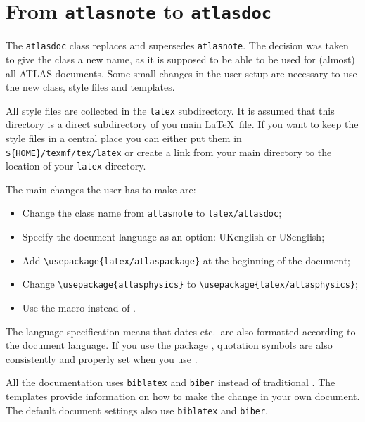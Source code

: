 \section{From \texttt{atlasnote} to \texttt{atlasdoc}}
\label{sec:oldnote}

The \texttt{atlasdoc} class replaces and supersedes \texttt{atlasnote}.
The decision was taken to give the class a new name, as it is supposed to be
able to be used for (almost) all ATLAS documents.
Some small changes in the user setup are necessary to use the new
class, style files and templates.

All style files are collected in the \texttt{latex} subdirectory.
It is assumed that this directory is a direct subdirectory of you main \LaTeX\ file.
If you want to keep the style files in a central place you can either put them in
\verb|${HOME}/texmf/tex/latex| or create a link from your main directory to the location of
your \texttt{latex} directory.

The main changes the user has to make are:
\begin{itemize}
\item Change the class name from \texttt{atlasnote} to \texttt{latex/atlasdoc};
\item Specify the document language as an option: UKenglish or USenglish;
\item Add \verb|\usepackage{latex/atlaspackage}| at the beginning of the document;
\item Change \verb|\usepackage{atlasphysics}| to \verb|\usepackage{latex/atlasphysics}|; 
\item Use the macro  instead of .
\end{itemize}

The language specification means that dates etc.\ are also formatted according to 
the document language. 
If you use the package , quotation symbols are also consistently and properly set
when you use .

All the documentation uses \texttt{biblatex} and \texttt{biber} instead of traditional \BibTeX.
The templates provide information on how to make the change in your own document.
The default document settings also use \texttt{biblatex} and \texttt{biber}.

